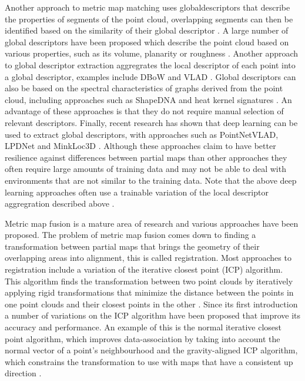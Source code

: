 Another approach to metric map matching uses \gls{globaldescriptor}s that describe the properties of segments of the point cloud, overlapping segments can then be identified based on the similarity of their global descriptor \citep{dube_segmatch_2017}. A large number of global descriptors have been proposed which describe the point cloud based on various properties, such as its volume, planarity or roughness \citep{han_comprehensive_2018}. Another approach to global descriptor extraction aggregrates the local descriptor of each point into a global descriptor, examples include DBoW and VLAD \citep{shan_robust_2021,arandjelovic_all_2013}. Global descriptors can also be based on the spectral characteristics of graphs derived from the point cloud, including approaches such as ShapeDNA and heat kernel signatures \citep{reuter_laplacebeltrami_2006,bronstein_scale-invariant_2010}. An advantage of these approaches is that they do not require manual selection of relevant descriptors. Finally, recent research has shown that deep learning can be used to extract global descriptors, with approaches such as PointNetVLAD, LPDNet and MinkLoc3D \citep{uy_pointnetvlad_2018-1,liu_lpd-net_2019,komorowski_minkloc3d_2021}. Although these approaches claim to have better resilience against differences between partial maps than other approaches they often require large amounts of training data and may not be able to deal with environments that are not similar to the training data. Note that the above deep learning approaches often use a trainable variation of the local descriptor aggregration described above \citep{arandjelovic_netvlad_2016}. 

Metric map fusion is a mature area of research and various approaches have been proposed. The problem of metric map fusion comes down to finding a transformation between partial maps that brings the geometry of their overlapping areas into alignment, this is called registration. Most approaches to registration include a variation of the iterative closest point (ICP) algorithm. This algorithm finds the transformation between two point clouds by iteratively applying rigid transformations that minimize the distance between the points in one point clouds and their closest points in the other \citep{rusinkiewicz_efficient_2001}. Since its first introduction a number of variations on the ICP algorithm have been proposed that improve its accuracy and performance. An example of this is the normal iterative closest point algorithm, which improves data-association by taking into account the normal vector of a point's neighbourhood and the gravity-aligned ICP algorithm, which constrains the transformation to use with maps that have a consistent up direction \citep{serafin_nicp_2015,kubelka_gravity-constrained_2022}. 


